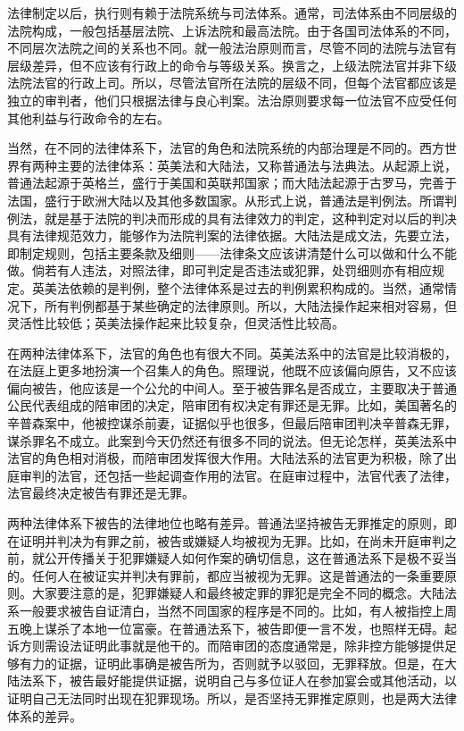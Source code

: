 法律制定以后，执行则有赖于法院系统与司法体系。通常，司法体系由不同层级的法院构成，一般包括基层法院、上诉法院和最高法院。由于各国司法体系的不同，不同层次法院之间的关系也不同。就一般法治原则而言，尽管不同的法院与法官有层级差异，但不应该有行政上的命令与等级关系。换言之，上级法院法官并非下级法院法官的行政上司。所以，尽管法官所在法院的层级不同，但每个法官都应该是独立的审判者，他们只根据法律与良心判案。法治原则要求每一位法官不应受任何其他利益与行政命令的左右。

当然，在不同的法律体系下，法官的角色和法院系统的内部治理是不同的。西方世界有两种主要的法律体系：英美法和大陆法，又称普通法与法典法。从起源上说，普通法起源于英格兰，盛行于美国和英联邦国家；而大陆法起源于古罗马，完善于法国，盛行于欧洲大陆以及其他多数国家。从形式上说，普通法是判例法。所谓判例法，就是基于法院的判决而形成的具有法律效力的判定，这种判定对以后的判决具有法律规范效力，能够作为法院判案的法律依据。大陆法是成文法，先要立法，即制定规则，包括主要条款及细则——法律条文应该讲清楚什么可以做和什么不能做。倘若有人违法，对照法律，即可判定是否违法或犯罪，处罚细则亦有相应规定。英美法依赖的是判例，整个法律体系是过去的判例累积构成的。当然，通常情况下，所有判例都基于某些确定的法律原则。所以，大陆法操作起来相对容易，但灵活性比较低；英美法操作起来比较复杂，但灵活性比较高。

在两种法律体系下，法官的角色也有很大不同。英美法系中的法官是比较消极的，在法庭上更多地扮演一个召集人的角色。照理说，他既不应该偏向原告，又不应该偏向被告，他应该是一个公允的中间人。至于被告罪名是否成立，主要取决于普通公民代表组成的陪审团的决定，陪审团有权决定有罪还是无罪。比如，美国著名的辛普森案中，他被控谋杀前妻，证据似乎也很多，但最后陪审团判决辛普森无罪，谋杀罪名不成立。此案到今天仍然还有很多不同的说法。但无论怎样，英美法系中法官的角色相对消极，而陪审团发挥很大作用。大陆法系的法官更为积极，除了出庭审判的法官，还包括一些起调查作用的法官。在庭审过程中，法官代表了法律，法官最终决定被告有罪还是无罪。

两种法律体系下被告的法律地位也略有差异。普通法坚持被告无罪推定的原则，即在证明并判决为有罪之前，被告或嫌疑人均被视为无罪。比如，在尚未开庭审判之前，就公开传播关于犯罪嫌疑人如何作案的确切信息，这在普通法系下是极不妥当的。任何人在被证实并判决有罪前，都应当被视为无罪。这是普通法的一条重要原则。大家要注意的是，犯罪嫌疑人和最终被定罪的罪犯是完全不同的概念。大陆法系一般要求被告自证清白，当然不同国家的程序是不同的。比如，有人被指控上周五晚上谋杀了本地一位富豪。在普通法系下，被告即便一言不发，也照样无碍。起诉方则需设法证明此事就是他干的。而陪审团的态度通常是，除非控方能够提供足够有力的证据，证明此事确是被告所为，否则就予以驳回，无罪释放。但是，在大陆法系下，被告最好能提供证据，说明自己与多位证人在参加宴会或其他活动，以证明自己无法同时出现在犯罪现场。所以，是否坚持无罪推定原则，也是两大法律体系的差异。

